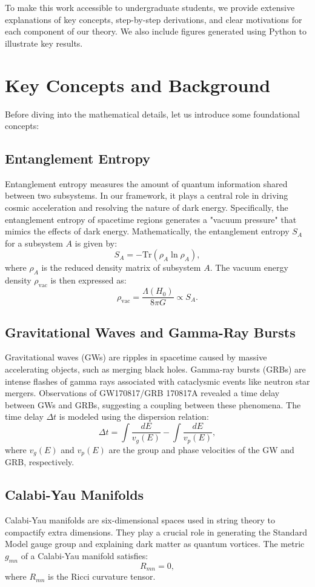\documentclass[12pt, a4paper]{article}
\begin{document}
To make this work accessible to undergraduate students, we provide extensive explanations of key concepts, step-by-step derivations, and clear motivations for each component of our theory. We also include figures generated using Python to illustrate key results.

\section{Key Concepts and Background}
Before diving into the mathematical details, let us introduce some foundational concepts:

\subsection{Entanglement Entropy}
Entanglement entropy measures the amount of quantum information shared between two subsystems. In our framework, it plays a central role in driving cosmic acceleration and resolving the nature of dark energy. Specifically, the entanglement entropy of spacetime regions generates a "vacuum pressure" that mimics the effects of dark energy. Mathematically, the entanglement entropy \(S_A\) for a subsystem \(A\) is given by:
\[
S_A = -\text{Tr}(\rho_A \ln \rho_A),
\]
where \(\rho_A\) is the reduced density matrix of subsystem \(A\). The vacuum energy density \(\rho_{\text{vac}}\) is then expressed as:
\[
\rho_{\text{vac}} = \frac{\Lambda(H_0)}{8\pi G} \propto S_A.
\]

\subsection{Gravitational Waves and Gamma-Ray Bursts}
Gravitational waves (GWs) are ripples in spacetime caused by massive accelerating objects, such as merging black holes. Gamma-ray bursts (GRBs) are intense flashes of gamma rays associated with cataclysmic events like neutron star mergers. Observations of GW170817/GRB 170817A revealed a time delay between GWs and GRBs, suggesting a coupling between these phenomena. The time delay \(\Delta t\) is modeled using the dispersion relation:
\[
\Delta t = \int \frac{dE}{v_g(E)} - \int \frac{dE}{v_p(E)},
\]
where \(v_g(E)\) and \(v_p(E)\) are the group and phase velocities of the GW and GRB, respectively.

\subsection{Calabi-Yau Manifolds}
Calabi-Yau manifolds are six-dimensional spaces used in string theory to compactify extra dimensions. They play a crucial role in generating the Standard Model gauge group and explaining dark matter as quantum vortices. The metric \(g_{mn}\) of a Calabi-Yau manifold satisfies:
\[
R_{mn} = 0,
\]
where \(R_{mn}\) is the Ricci curvature tensor.
\end{document}
